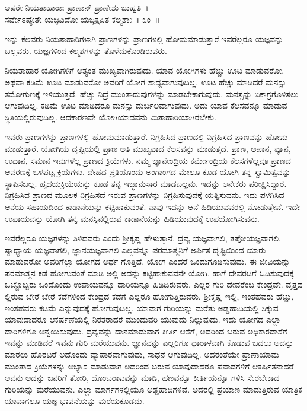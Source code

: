 \begin{shloka}
ಅಪರೇ ನಿಯತಾಹಾರಾಃ ಪ್ರಾಣಾನ್ ಪ್ರಾಣೇಶು ಜುಹ್ವತಿ~।\\ಸರ್ವೇಽಪ್ಯೇತೇ ಯಜ್ಞವಿದೋ ಯಜ್ಞಕ್ಷಪಿತ ಕಲ್ಮಶಾಃ \hfill॥ ೩ಂ~॥
\end{shloka}

\begin{artha}
ಇನ್ನು ಕೆಲವರು ನಿಯತಾಹಾರಿಗಳಾಗಿ ಪ್ರಾಣಗಳನ್ನು ಪ್ರಾಣಗಳಲ್ಲಿ ಹೋಮಮಾಡುತ್ತಾರೆ.\break ಇವರೆಲ್ಲರೂ ಯಜ್ಞವನ್ನು ಬಲ್ಲವರು. ಯಜ್ಞಗಳಿಂದ ಕಲ್ಮಶಗಳನ್ನು ತೊಳೆದುಕೊಂಡಿರುವರು.
\end{artha}

\newpage

ನಿಯತಾಹಾರ ಯೋಗಿಗಳಿಗೆ ಅತ್ಯಂತ ಮುಖ್ಯವಾಗಿರುವುದು. ಯಾವ ಯೋಗಿಗಳು ಹೆಚ್ಚು ಊಟ ಮಾಡುವರೋ, ಅಥವಾ ಕಡಿಮೆ ಊಟ ಮಾಡುವರೋ ಅವರಿಗೆ ಯೋಗ ಸಾಧ್ಯವಾಗುವುದಿಲ್ಲ. ಊಟ ಹೆಚ್ಚು ಮಾಡಿದರೆ ಮನಸ್ಸು ತಮೋಗುಣಕ್ಕೆ ಇಳಿಯುತ್ತದೆ. ಹೆಚ್ಚು ನಿದ್ರೆ ಮುಂತಾದುವುಗಳನ್ನು ಮಾಡಬೇಕಾಗುವುದು. ಮನಸ್ಸನ್ನು ಏಕಾಗ್ರಗೊಳಿಸಲು ಆಗುವುದಿಲ್ಲ. ಕಡಿಮೆ ಊಟ ಮಾಡಿದರೂ ಮನಸ್ಸು ದುರ್ಬಲವಾಗುವುದು. ಅದು ಯಾವ ಕೆಲಸವನ್ನೂ ಮಾಡುವ ಸ್ಥಿತಿಯಲ್ಲಿರುವುದಿಲ್ಲ. ಆದಕಾರಣವೇ ಯೋಗಿಯಾದವನು ಮಿತಾಹಾರಿಯಾಗಿರಬೇಕು.

ಇವರು ಪ್ರಾಣಗಳನ್ನು ಪ್ರಾಣಗಳಲ್ಲಿ ಹೋಮಮಾಡುತ್ತಾರೆ. ನಿಗ್ರಹಿಸಿದ ಪ್ರಾಣದಲ್ಲಿ ನಿಗ್ರಹಿಸದ ಪ್ರಾಣವನ್ನು ಹೋಮ ಮಾಡುತ್ತಾರೆ. ಯೋಗಿಯ ದೃಷ್ಟಿಯಲ್ಲಿ ಪ್ರಾಣ ಅತಿ ಮುಖ್ಯವಾದ ಕೆಲಸವನ್ನು ಮಾಡುತ್ತದೆ. ಪ್ರಾಣ, ಅಪಾನ, ವ್ಯಾನ, ಉದಾನ, ಸಮಾನ ಇವುಗಳೆಲ್ಲ ಪ್ರಾಣದ ಕ್ರಿಯೆಗಳು. ನಮ್ಮ ಜ್ಞಾನೇಂದ್ರಿಯ ಕರ್ಮೇಂದ್ರಿಯ ಕೆಲಸಗಳೆಲ್ಲವೂ ಪ್ರಾಣದ ಆವರಣಕ್ಕೆ ಒಳಪಟ್ಟ ಕ್ರಿಯೆಗಳು. ದೇಹದ ಪ್ರತಿಯೊಂದು ಅಂಗಾಂಗದ ಮೇಲೂ ಕೂಡ ಯೋಗಿ ತನ್ನ ಸ್ವಾಮಿತ್ವವನ್ನು ಸ್ಥಾಪಿಸಬಲ್ಲ. ಹೃದಯಕ್ರಿಯೆಯನ್ನು ಕೂಡ ತನ್ನ ಇಚ್ಛಾನುಸಾರ ಮಾಡಬಲ್ಲನು. ಇದನ್ನು ಅನೇಕರು ಪರೀಕ್ಷಿಸಿದ್ದಾರೆ. ನಿಗ್ರಹಿಸಿದ ಪ್ರಾಣದ ಮೂಲಕ ನಿಗ್ರಹಿಸದೆ ಇರುವ ಪ್ರಾಣಗಳನ್ನು ನಿಗ್ರಹಿಸುವುದಕ್ಕೆ ಯತ್ನಿಸುವನು. ಇದು ಪಳಗಿಸಿದ ಆನೆಯ ಸಹಾಯದಿಂದ ಕಾಡಾನೆಯನ್ನು ಕಟ್ಟಿಹಾಕುವಂತೆ. ನಾವು ಇದನ್ನು ಆನೆ ಹಿಡಿಯುವವರಲ್ಲಿ ನೋಡುತ್ತೇವೆ. ಇದೇ ಉಪಾಯವನ್ನು ಯೋಗಿ ತನ್ನ ಮನಸ್ಸಿನಲ್ಲಿರುವ ಕಾಡಾನೆಯನ್ನು ಹಿಡಿಯುವುದಕ್ಕೆ ಉಪಯೋಗಿಸುವನು.

ಇವರೆಲ್ಲರೂ ಯಜ್ಞಗಳನ್ನು ತಿಳಿದವರು ಎಂದು ಶ‍್ರೀಕೃಷ್ಣ ಹೇಳುತ್ತಾನೆ. ದ್ರವ್ಯ ಯಜ್ಞವಾಗಲಿ, ತಪೋಯಜ್ಞವಾಗಲಿ, ಸ್ವಾಧ್ಯಾಯ ಯಜ್ಞವಾಗಲಿ, ಜ್ಞಾನಯಜ್ಞವಾಗಲಿ ಎಲ್ಲವನ್ನೂ ಪರಮಾತ್ಮನಿಗೆ ಅರ್ಪಿತ ದೃಷ್ಟಿಯಿಂದ ಯಾರು ಮಾಡುವರೋ ಅವರಿಗೆಲ್ಲಾ ಯೋಗದ ಅರ್ಥ ಗೊತ್ತಿದೆ. ಯೋಗ ಎಂದರೆ ಒಂದುಗೂಡಿಸುವುದು. ಈ ಜೀವಿಯನ್ನು ಪರಮಾತ್ಮನ ಕಡೆ ಹೋಗುವಂತೆ ಮಾಡಿ ಅಲ್ಲಿ ಅದನ್ನು ಕಟ್ಟಿಹಾಕುವವನೇ ಯೋಗಿ. ಹಾಗೆ ದೇವರಡಿಗೆ ಓಡಿಸುವುದಕ್ಕೆ ಒಬ್ಬೊಬ್ಬರು ಒಂದೊಂದು ಉಪಾಯವನ್ನೂ ದಾರಿಯನ್ನೂ ಹಿಡಿದಿರುವರು. ಎಲ್ಲರ ಗುರಿ ದೇವರೆಂಬ ಕೇಂದ್ರವೇ. ವೃತ್ತದ ಲ್ಲಿರುವ ಬೇರೆ ಬೇರೆ ಕಡೆಗಳಿಂದ ಕೇಂದ್ರದ ಕಡೆಗೆ ಎಲ್ಲರೂ ಹೋಗುತ್ತಿರುವರು. ಶ‍್ರೀಕೃಷ್ಣ ಇಲ್ಲಿ, ಇಂತಹವರು ಹೆಚ್ಚು, ಇಂತಹವರು ಕಡಿಮೆ ಎನ್ನುವುದಕ್ಕೆ ಹೋಗುವುದಿಲ್ಲ. ಯಾವಾಗ ಗುರಿಯನ್ನು ಮರೆತು ಅಡ್ಡಹಾದಿಯಲ್ಲಿ ಸಿಕ್ಕುವ ಯಾವುದಾದರೂ ಆಕರ್ಷಣೆಯಲ್ಲಿ ನಿರತರಾದರೆ ಮುಂದುವರಿ ಯುವುದು ನಿಲ್ಲುವುದು. ಇದು ಯೋಗದ ಎಲ್ಲಾ ದಾರಿಗಳಿಗೂ ಅನ್ವಯಿಸುವುದು. ದ್ರವ್ಯವನ್ನು ದಾನಮಾಡುವಾಗ ಕೀರ್ತಿ ಆಸೆಗೆ, ಅದರಿಂದ ಬರುವ ಅಧಿಕಾರದಾಸೆಗೆ ಇವನ್ನು ಮಾಡಿದರೆ ಇವನು ಗುರಿ ಮರೆಯುವನು. ಜ್ಞಾನವನ್ನು ಎಲ್ಲರಿಗೂ ಧಾರಾಳವಾಗಿ ಕೊಡುವ ಬದಲು ಅದನ್ನು ಮಾರಲು ಹೊರಟರೆ ಅದೊಂದು ವ್ಯಾಪಾರವಾಗುವುದು, ಸಾಧನೆ ಆಗುವುದಿಲ್ಲ. ಅದರಂತೆಯೇ ಪ್ರಾಣಾಯಾಮ ಮುಂತಾದ ಕ್ರಿಯೆಗಳನ್ನು ಅಭ್ಯಾಸ ಮಾಡುವಾಗ ಅದರಿಂದ ಬರುವ ಯಾವುದಾದರೂ ಪವಾಡಗಳಿಗೆ ಆಕರ್ಷಿತನಾದರೆ ಅವನು ಅದನ್ನು ಜನರಿಗೆ ತೋರಿ, ದೊಂಬರಾಟವನ್ನು ಮಾಡಿ, ಹಣವನ್ನೊ ಕೀರ್ತಿಯನ್ನೊ ಗಳಿಸಿ ಸೇರಬೇಕಾದ ಗುರಿಯನ್ನು ಮರೆಯುವನು. ಎಲ್ಲಾ ಮಾರ್ಗಗಳಲ್ಲಿಯೂ ಅಡ್ಡಹಾದಿಗಳಿವೆ. ಅದರಲ್ಲಿ ಪ್ರಯಾಣ ಮಾಡುತ್ತಿರುವ ಯಾತ್ರಿಕ ಯಾವಾಗಲೂ ಯಜ್ಞ ಭಾವನೆಯನ್ನು ಮರೆಯಕೂಡದು.

